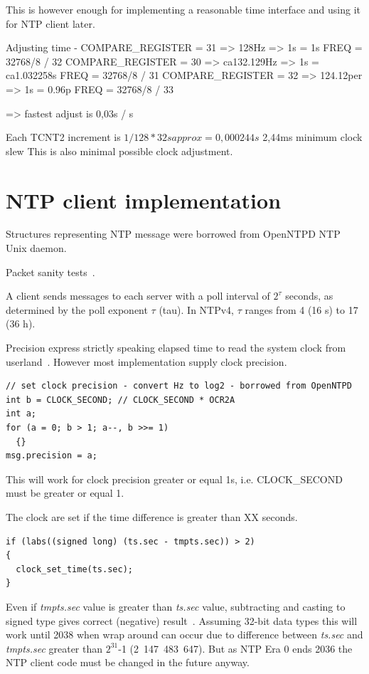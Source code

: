 
This is however enough for implementing a reasonable time interface and using it for NTP client later.



Adjusting time - COMPARE\_REGISTER = 31 => 128Hz => 1s = 1s
FREQ = 32768/8 / 32
COMPARE\_REGISTER = 30 => ca132.129Hz => 1s = ca1.032258s
FREQ = 32768/8 / 31
COMPARE\_REGISTER = 32 => 124.12per => 1s = 0.96p
FREQ = 32768/8 / 33

=> fastest adjust is 0,03s / s


Each TCNT2 increment is $1/128*32 s  approx= 0,000244 s$
2,44ms minimum clock slew
This is also minimal possible clock adjustment.



\section{NTP client implementation}
Structures representing NTP message were borrowed from OpenNTPD NTP Unix daemon.

Packet sanity tests~\cite{ntp-arch}.

A client sends messages to each server with a poll interval of $2^{\tau}$
seconds, as determined by the poll exponent $\tau$ (tau).
In NTPv4, $\tau$ ranges from 4 (16 s) to 17 (36 h).


Precision express strictly speaking elapsed time to read the system clock from userland~\cite{ntp-arch}.
However most implementation supply clock precision.
\begin{lstlisting}
// set clock precision - convert Hz to log2 - borrowed from OpenNTPD
int b = CLOCK_SECOND; // CLOCK_SECOND * OCR2A
int a;
for (a = 0; b > 1; a--, b >>= 1)
  {}
msg.precision = a;
\end{lstlisting}
This will work for clock precision greater or equal 1s, i.e. CLOCK\_SECOND must be greater or equal 1.

The clock are set if the time difference is greater than XX seconds. %
\begin{lstlisting}
if (labs((signed long) (ts.sec - tmpts.sec)) > 2)
{
  clock_set_time(ts.sec);
}
\end{lstlisting}
Even if {\it{tmpts.sec}} value is greater than {\it{ts.sec}} value,
subtracting and casting to signed type gives correct (negative) result~\cite{c99}.
Assuming 32-bit data types this will work until 2038 when wrap around can occur due to difference
between {\it{ts.sec}} and {\it{tmpts.sec}} greater than $2^{31}$-1 (2~147~483~647).
But as NTP Era 0 ends 2036 the NTP client code must be changed in the future anyway.

